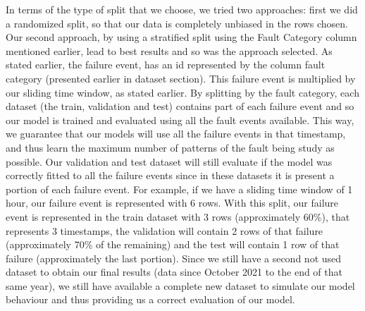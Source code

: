 In terms of the type of split that we choose, we tried two approaches: first we did a randomized split, so that our data is completely unbiased in the rows chosen. Our second approach, by using a stratified split using the Fault Category column mentioned earlier, lead to best results and so was the approach selected.
As stated earlier, the failure event, has an id represented by the column fault category (presented earlier in dataset section). This failure event is multiplied by our sliding time window, as stated earlier. By splitting by the fault category, each dataset (the train, validation and test) contains part of each failure event and so our model is trained and evaluated using all the fault events available. This way, we guarantee that our models will use all the failure events in that timestamp, and thus learn the maximum number of patterns of the fault being study as possible. Our validation and test dataset will still evaluate if the model was correctly fitted to all the failure events since in these datasets it is present a portion of each failure event.
For example, if we have a sliding time window of 1 hour, our failure event is represented with 6 rows. With this split, our failure event is represented in the train dataset with 3 rows (approximately 60\%), that represents 3 timestamps, the validation will contain 2 rows of that failure (approximately 70\% of the remaining) and the test will contain 1 row of that failure (approximately the last portion).
Since we still have a second not used dataset to obtain our final results (data since October 2021 to the end of that same year), we still have available a complete new dataset to simulate our model behaviour and thus providing us a correct evaluation of our model.


